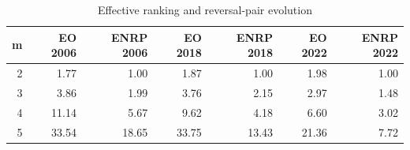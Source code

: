 \begin{table}[!htbp]
\centering
\caption{Effective ranking and reversal-pair evolution}
\label{tab:effective-ranking-evolution}
\begin{tabular}{rrrrrrr}
\hline
m & EO 2006 & ENRP 2006 & EO 2018 & ENRP 2018 & EO 2022 & ENRP 2022 \\
\hline
2 & 1.77 & 1.00 & 1.87 & 1.00 & 1.98 & 1.00 \\
3 & 3.86 & 1.99 & 3.76 & 2.15 & 2.97 & 1.48 \\
4 & 11.14 & 5.67 & 9.62 & 4.18 & 6.60 & 3.02 \\
5 & 33.54 & 18.65 & 33.75 & 13.43 & 21.36 & 7.72 \\
\hline
\end{tabular}
\end{table}
